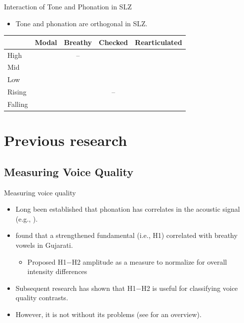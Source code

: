 \documentclass[professionalfont]{beamer}
\providecommand{\lsptoprule}{\midrule\toprule}
\providecommand{\lspbottomrule}{\bottomrule\midrule}
\newcommand{\cmark}{\ding{51}}%
\begin{document}
\begin{frame}{Interaction of Tone and Phonation in SLZ}
  \begin{itemize}
    \item Tone and phonation are orthogonal in SLZ.
  \end{itemize}
  \begin{table}[h!]
	\centering
	  \begin{tabular}{lcccc}
	    \lsptoprule
		  & \textbf{Modal} & \textbf{Breathy} & \textbf{Checked} & \textbf{Rearticulated} \\
	    \hline
	    High		& \cmark & -- & \cmark & \cmark \\
	    Mid			& \cmark & \cmark & \cmark & \cmark \\
	    Low			& \cmark & \cmark & \cmark & \cmark \\
	    Rising	& \cmark & \cmark & -- & \cmark \\
      Falling	& \cmark & \cmark & \cmark & \cmark \\
	    \lspbottomrule
	  \end{tabular}
  \end{table} 
\end{frame}

\section{Previous research}
\subsection{Measuring Voice Quality}

\begin{frame}{Measuring voice quality}
  \begin{itemize}
    \item Long been established that phonation has correlates in the acoustic signal (e.g., \cite{fischer-jorgensenPhoneticAnalysisBreathy1968,klattAnalysisSynthesisPerception1990}).
    \item \citet{fischer-jorgensenPhoneticAnalysisBreathy1968} found that a strengthened fundamental (i.e., H1) correlated with breathy vowels in Gujarati.
    \begin{itemize}
      \item Proposed H1$-$H2 amplitude as a measure to normalize for overall intensity differences
    \end{itemize}
    \item Subsequent research has shown that H1$-$H2 is useful for classifying voice quality contrasts.  
    \item However, it is not without its problems (see \cite{chaiH1H2AcousticMeasure2022} for an overview).
  \end{itemize}
\end{frame}
\end{document}
